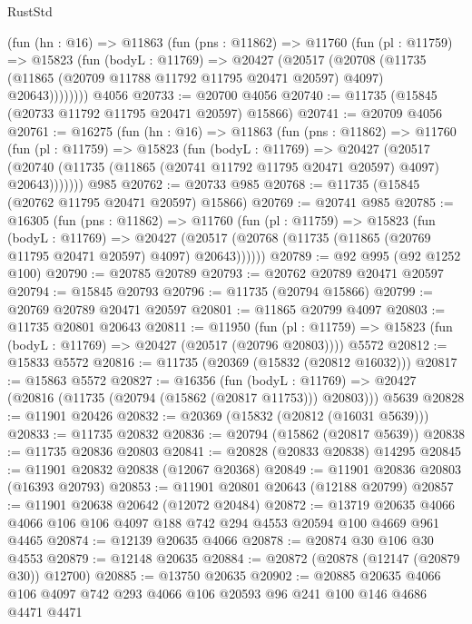 \begin{lexlean}{RustStd}
\begin{coremodule}
      (fun (hn : @16) =>
      @11863
        (fun (pns : @11862) =>
        @11760
          (fun (pl : @11759) =>
          @15823
            (fun (bodyL : @11769) =>
            @20427
              (@20517
                (@20708
                  (@11735 (@11865 (@20709 @11788 @11792 @11795 @20471 @20597) @4097) @20643))))))))
    @4056
@20733 := @20700 @4056
@20740 := @11735 (@15845 (@20733 @11792 @11795 @20471 @20597) @15866)
@20741 := @20709 @4056
@20761 := @16275
    (fun (hn : @16) =>
    @11863
      (fun (pns : @11862) =>
      @11760
        (fun (pl : @11759) =>
        @15823
          (fun (bodyL : @11769) =>
          @20427
            (@20517
              (@20740 (@11735 (@11865 (@20741 @11792 @11795 @20471 @20597) @4097) @20643)))))))
    @985
@20762 := @20733 @985
@20768 := @11735 (@15845 (@20762 @11795 @20471 @20597) @15866)
@20769 := @20741 @985
@20785 := @16305
    (fun (pns : @11862) =>
    @11760
      (fun (pl : @11759) =>
      @15823
        (fun (bodyL : @11769) =>
        @20427 (@20517 (@20768 (@11735 (@11865 (@20769 @11795 @20471 @20597) @4097) @20643))))))
@20789 := @92 @995 (@92 @1252 @100)
@20790 := @20785 @20789
@20793 := @20762 @20789 @20471 @20597
@20794 := @15845 @20793
@20796 := @11735 (@20794 @15866)
@20799 := @20769 @20789 @20471 @20597
@20801 := @11865 @20799 @4097
@20803 := @11735 @20801 @20643
@20811 := @11950
    (fun (pl : @11759) => @15823 (fun (bodyL : @11769) => @20427 (@20517 (@20796 @20803))))
    @5572
@20812 := @15833 @5572
@20816 := @11735 (@20369 (@15832 (@20812 @16032)))
@20817 := @15863 @5572
@20827 := @16356
    (fun (bodyL : @11769) => @20427 (@20816 (@11735 (@20794 (@15862 (@20817 @11753))) @20803)))
    @5639
@20828 := @11901 @20426
@20832 := @20369 (@15832 (@20812 (@16031 @5639)))
@20833 := @11735 @20832
@20836 := @20794 (@15862 (@20817 @5639))
@20838 := @11735 @20836 @20803
@20841 := @20828 (@20833 @20838) @14295
@20845 := @11901 @20832 @20838 (@12067 @20368)
@20849 := @11901 @20836 @20803 (@16393 @20793)
@20853 := @11901 @20801 @20643 (@12188 @20799)
@20857 := @11901 @20638 @20642 (@12072 @20484)
@20872 := @13719
    @20635
    @4066
    @4066
    @106
    @106
    @4097
    @188
    @742
    @294
    @4553
    @20594
    @100
    @4669
    @961
    @4465
@20874 := @12139 @20635 @4066
@20878 := @20874 @30 @106 @30 @4553
@20879 := @12148 @20635
@20884 := @20872 (@20878 (@12147 (@20879 @30)) @12700)
@20885 := @13750 @20635
@20902 := @20885
    @20635
    @4066
    @106
    @4097
    @742
    @293
    @4066
    @106
    @20593
    @96
    @241
    @100
    @146
    @4686
    @4471
    @4471

\end{coremodule}
\end{lexlean}
